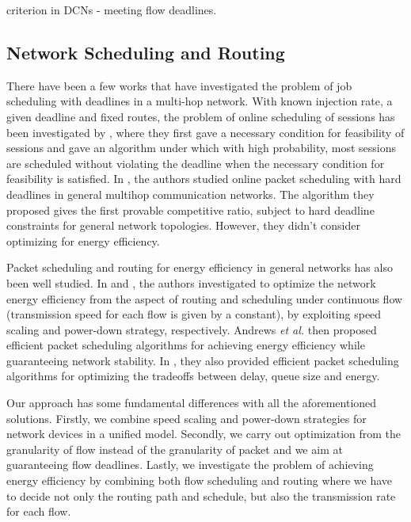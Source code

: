 \documentclass[10pt, conference, compsocconf]{IEEEtran}
\begin{document}
criterion in DCNs - meeting flow deadlines. 

\subsection{Network Scheduling and Routing}

There have been a few works that have investigated the problem of job scheduling with deadlines in a multi-hop network. With known injection rate, a given deadline and fixed routes, the problem of online scheduling of sessions has been investigated by \cite{Andrews_Zhang-1999}, where they first gave a necessary condition for feasibility of sessions and gave an algorithm under which with high probability, most sessions are scheduled without violating the deadline when the necessary condition for feasibility is satisfied. In \cite{Mao_Koksal-2013}, the authors studied online packet scheduling with hard deadlines in general multihop communication networks. The algorithm they proposed gives the first provable competitive ratio, subject to hard deadline constraints for general network topologies. However, they didn't consider optimizing for energy efficiency.

Packet scheduling and routing for energy efficiency in general networks has also been well studied. In \cite{Andrews_Fernandez-SS-2010} and \cite{Andrews_Anta-pd}, the authors investigated to optimize the network energy efficiency from the aspect of routing and scheduling under continuous flow (transmission speed for each flow is given by a constant), by exploiting speed scaling and power-down strategy, respectively. Andrews \emph{et al.} \cite{Andrews_Antonakopoulos-2011} then proposed efficient packet scheduling algorithms for achieving energy efficiency while guaranteeing network stability. In \cite{Andrews_Zhang-2012}, they also provided efficient packet scheduling algorithms for optimizing the tradeoffs between delay, queue size and energy. 

Our approach has some fundamental differences with all the aforementioned solutions. Firstly, we combine speed scaling and power-down strategies for network devices in a unified model. Secondly, we carry out optimization from the granularity of flow instead of the granularity of packet and we aim at guaranteeing flow deadlines. Lastly, we investigate the problem of achieving energy efficiency by combining both flow scheduling and routing where we have to decide not only the routing path and schedule, but also the transmission rate for each flow. 
\end{document}
